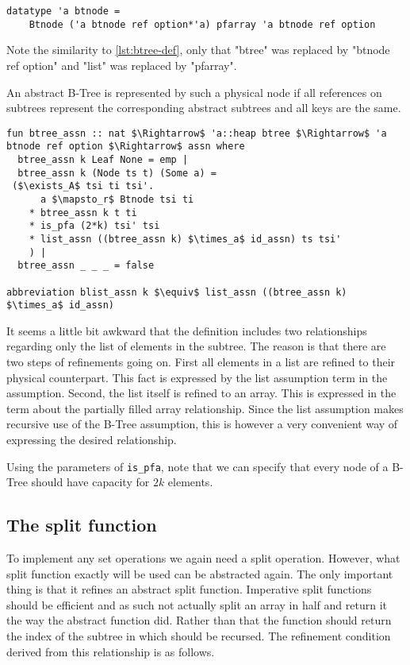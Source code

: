 \begin{lstlisting}[mathescape=true, language=Isabelle]
datatype 'a btnode =
    Btnode ('a btnode ref option*'a) pfarray 'a btnode ref option
\end{lstlisting}

Note the similarity to \autoref{lst:btree-def},
only that "btree" was replaced by "btnode ref option"
and "list" was replaced by "pfarray".

An abstract B-Tree is represented by such a physical node
if all references on subtrees represent the corresponding
abstract subtrees and all keys are the same.

\begin{lstlisting}[mathescape=true, language=Isabelle]
fun btree_assn :: nat $\Rightarrow$ 'a::heap btree $\Rightarrow$ 'a btnode ref option $\Rightarrow$ assn where
  btree_assn k Leaf None = emp |
  btree_assn k (Node ts t) (Some a) = 
 ($\exists_A$ tsi ti tsi'.
      a $\mapsto_r$ Btnode tsi ti
    * btree_assn k t ti
    * is_pfa (2*k) tsi' tsi
    * list_assn ((btree_assn k) $\times_a$ id_assn) ts tsi'
    ) |
  btree_assn _ _ _ = false

abbreviation blist_assn k $\equiv$ list_assn ((btree_assn k) $\times_a$ id_assn)

\end{lstlisting}

It seems a little bit awkward that the definition
includes two relationships regarding only the list of elements in the subtree.
The reason is that there are two steps of refinements going on.
First all elements in a list are refined to their physical counterpart.
This fact is expressed by the list assumption term in the assumption.
Second, the list itself is refined to an array.
This is expressed in the term about the partially filled array relationship.
Since the list assumption makes recursive use of the
B-Tree assumption, this is however a very convenient
way of expressing the desired relationship.

Using the parameters of \texttt{is\_pfa},
note that we can specify that every node of a B-Tree should have
capacity for $2k$ elements.

\subsection{The split function}
\label{sec:imp-split}

To implement any set operations we again need a split operation.
However, what split function exactly will be used can be abstracted again.
The only important thing is that it refines an abstract split function.
Imperative split functions should be efficient and as such not actually
split an array in half and return it the way the abstract function did.
Rather than that the function should return the index of the subtree
in which should be recursed.
The refinement condition derived from this relationship is as follows.

